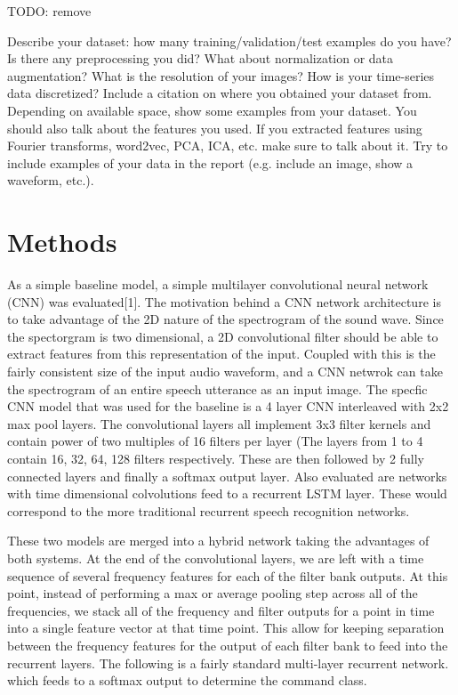 \documentclass{article}
\begin{document}
TODO: remove

Describe your dataset: how many training/validation/test examples do you have? Is there
any preprocessing you did? What about normalization or data augmentation? What is the
resolution of your images? How is your time-series data discretized? Include a citation on
where you obtained your dataset from. Depending on available space, show some examples
from your dataset. You should also talk about the features you used. If you extracted
features using Fourier transforms, word2vec, PCA,
ICA, etc. make sure to talk about it. Try to include examples of your data in the report
(e.g. include an image, show a waveform, etc.).



\section{ Methods }
As a simple baseline model, a simple multilayer convolutional neural
network (CNN) was evaluated[1]. The motivation behind a CNN network
architecture is to take advantage of the 2D nature of the spectrogram
of the sound wave. Since the spectorgram is two dimensional, a 2D
convolutional filter should be able to extract features from this
representation of the input. Coupled with this is the fairly
consistent size of the input audio waveform, and a CNN netwrok can
take the spectrogram of an entire speech utterance as an input
image. The specfic CNN model that was used for the baseline is a 4
layer CNN interleaved with 2x2 max pool layers. The convolutional
layers all implement 3x3 filter kernels and contain power of two
multiples of 16 filters per layer (The layers from 1 to 4 contain
16, 32, 64, 128 filters respectively. These are then followed by 2
fully connected layers and finally a softmax output layer. Also
evaluated are networks with time dimensional colvolutions feed to a
recurrent LSTM layer. These would correspond to the more traditional
recurrent speech recognition networks.

These two models are merged into a hybrid network taking the
advantages of both systems. At the end of the convolutional layers, we
are left with a time sequence of several frequency features for each
of the filter bank outputs. At this point, instead of performing a max
or average pooling step across all of the frequencies, we stack all of
the frequency and filter outputs for a point in time into a single
feature vector at that time point. This allow for keeping separation
between the frequency features for the output of each filter bank to
feed into the recurrent layers. The following is a fairly standard
multi-layer recurrent network. which feeds to a softmax output to
determine the command class.
\end{document}
